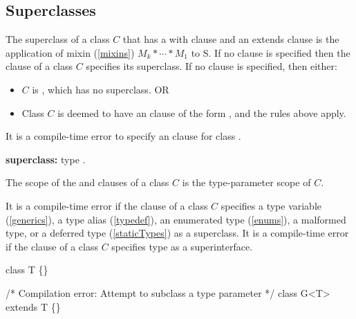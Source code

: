 \documentclass{article}
\begin{document}
\subsection{Superclasses}

\LMHash{}
The superclass of a class $C$ that has a with clause  and an extends clause  is the application of mixin (\ref{mixins}) $M_k* \cdots * M_1$ to S.
If no \WITH{} clause is specified then the \EXTENDS{} clause of a class $C$ specifies its superclass.
If no \EXTENDS{} clause is specified, then either:
\begin{itemize}
\item $C$ is , which has no superclass. OR
\item Class $C$ is deemed to have an \EXTENDS{} clause of the form , and the rules above apply.
\end{itemize}

\LMHash{}
It is a compile-time error to specify an \EXTENDS{} clause for class .

\begin{grammar}
{\bf superclass:}\EXTENDS{} type
  .
\end{grammar}


\LMHash{}
The scope of the \EXTENDS{} and \WITH{} clauses of a class $C$ is the type-parameter scope of $C$.

\LMHash{}
It is a compile-time error if the \EXTENDS{} clause of a class $C$ specifies a type variable (\ref{generics}), a type alias (\ref{typedef}), an enumerated type (\ref{enums}), a malformed type, or a deferred type (\ref{staticTypes}) as a superclass.
It is a compile-time error if the \EXTENDS{} clause of a class $C$ specifies type \DYNAMIC{} as a superinterface.


\begin{dartCode}
class T \{\}

/* Compilation error: Attempt to subclass a type parameter */
class G<T> extends T \{\}

\end{dartCode}
\end{document}
